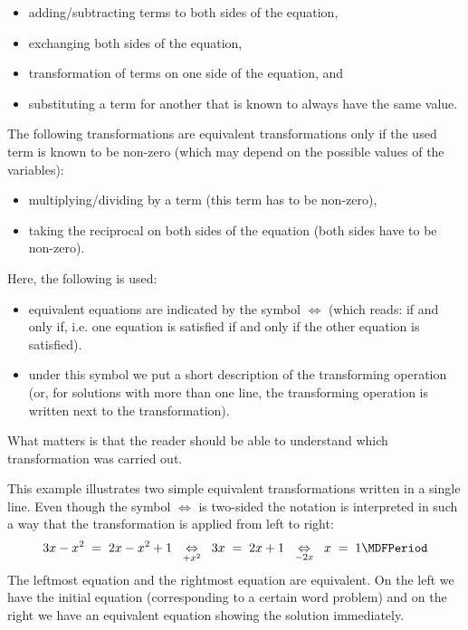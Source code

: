 \begin{MIntro}
\begin{MInfo}
\begin{itemize}
 \item{adding/subtracting terms to both sides of the equation,}
 \item{exchanging both sides of the equation,}
 \item{transformation of terms on one side of the equation, and}
 \item{substituting a term for another that is known to always have the same value.}
 \end{itemize}

The following transformations are equivalent transformations only if the used term is known to be non-zero (which may depend on the possible values of the variables):

\begin{itemize}
 \item{multiplying/dividing by a term (this term has to be non-zero),}
 \item{taking the reciprocal on both sides of the equation (both sides have to be non-zero).}
\end{itemize}
\end{MInfo}

Here, the following  is used:

\begin{itemize}
 \item{equivalent equations are indicated by the symbol $\Leftrightarrow$ (which reads: if and only if, i.e. one
  equation is satisfied if and only if the other equation is satisfied).}

\item{under this symbol we put a short description of the transforming operation (or, for solutions with more than one line, the 
  transforming operation is written next to the transformation).}
\end{itemize}

What matters is that the reader should be able to understand which transformation was carried out.

\begin{MExample}
This example illustrates two simple equivalent transformations written in a single line. Even though the symbol $\Leftrightarrow$ 
is two-sided the notation is interpreted in such a way that the transformation is applied from 
left to right:
$$
3x-x^2 \;=\; 2x-x^2+1\;\;\MUnderset{+x^2}\Leftrightarrow\;\;  3x\;=\; 2x+1 \;\;\MUnderset{-2x}\Leftrightarrow\;\; x \;=\; 1 \MDFPeriod
$$
The leftmost equation and the rightmost equation are equivalent. On the left we have the initial equation
(corresponding to a certain word problem) and on the right we have an equivalent equation 
showing the solution immediately.
\end{MExample}


\end{MIntro}

